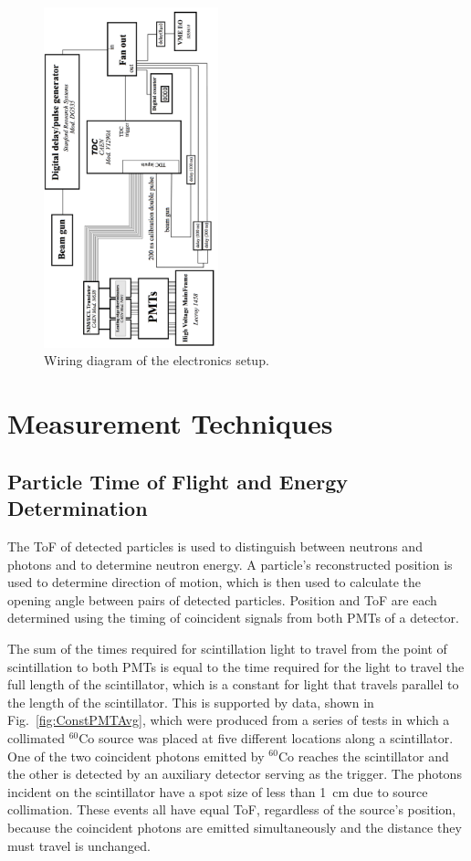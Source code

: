 \documentclass[%
 reprint,
 amsmath,amssymb,
 aps,
 nofootinbib
]{revtex4-1}
\begin{document}
\begin{figure}[h]
\includegraphics[width=0.45\textwidth]{WiringDiagram.png}
\caption{Wiring diagram of the electronics setup. }
\label{fig:WiringDiagram}
\end{figure}

\section{Measurement Techniques}
\subsection{Particle Time of Flight and Energy Determination}
\label{ToF_reconstruction}
The ToF of detected particles is used to distinguish between neutrons and photons and to determine neutron energy.
A particle's reconstructed position is used to determine direction of motion, which is then used to calculate the opening angle between pairs of detected particles.
Position and ToF are each determined using the timing of coincident signals from both PMTs of a detector.

The sum of the times required for scintillation light to travel from the point of scintillation to both PMTs is equal to the time required for the light to travel the full length of the scintillator, which is a constant for light that travels parallel to the length of the scintillator.
This is supported by data, shown in Fig.~\ref{fig:ConstPMTAvg}, which were produced from a series of tests in which a collimated $^{60}$Co source was placed at five different locations along a scintillator.
One of the two coincident photons emitted by $^{60}$Co reaches the scintillator and the other is detected by an auxiliary detector serving as the trigger. 
The photons incident on the scintillator have a spot size of less than 1~cm due to source collimation.
These events all have equal ToF, regardless of the source's position, because the coincident photons are emitted simultaneously and the distance they must travel is unchanged. 
\end{document}
